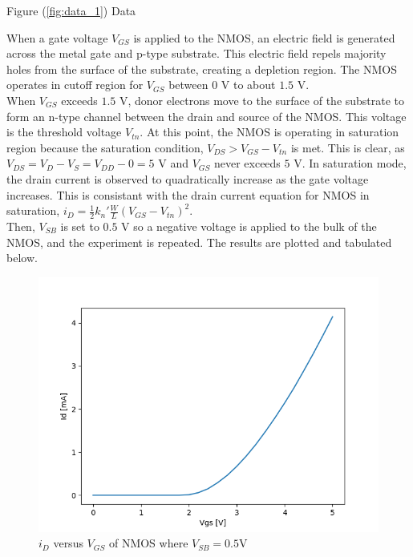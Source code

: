 \FloatBarrier

\begin{table}[h!]
	\centering
	\caption{Figure (\ref{fig:data_1}) Data}
	\label{tab:data_1}
\end{table}

\FloatBarrier

When a gate voltage $V_{GS}$ is applied to the NMOS, an electric field is generated across the metal gate and p-type substrate. 
This electric field repels majority holes from the surface of the substrate, creating a depletion region. 
The NMOS operates in cutoff region for $V_{GS}$ between $0$ \si{\volt} to about $1.5$ \si{\volt}. \\

When $V_{GS}$ exceeds $1.5$ \si{\volt}, donor electrons move to the surface of the substrate to form an n-type channel between the drain and source of the NMOS. 
This voltage is the threshold voltage $V_{tn}$. 
At this point, the NMOS is operating in saturation region because the saturation condition, $V_{DS} > V_{GS} - V_{tn}$ is met.
This is clear, as $V_{DS} = V_D - V_S = V_{DD} - 0 = 5$ \si{\volt} and $V_{GS}$ never exceeds $5$ \si{\volt}.
In saturation mode, the drain current is observed to quadratically increase as the gate voltage increases.
This is consistant with the drain current equation for NMOS in saturation, $i_D = \frac{1}{2}k_n' \frac{W}{L} (V_{GS} - V_{tn})^2$. \\

Then, $V_{SB}$ is set to $0.5$ \si{\volt} so a negative voltage is applied to the bulk of the NMOS, and the experiment is repeated.
The results are plotted and tabulated below. \\

\FloatBarrier

\begin{figure}[h!]
	\centering
	\includegraphics[scale=0.75]{./images/data_1_lower_body.PNG}
	\caption{$i_{D}$ versus $V_{GS}$ of NMOS where $V_{SB}= 0.5$\si{\volt}}
	\label{fig:data_1_b}
\end{figure}

